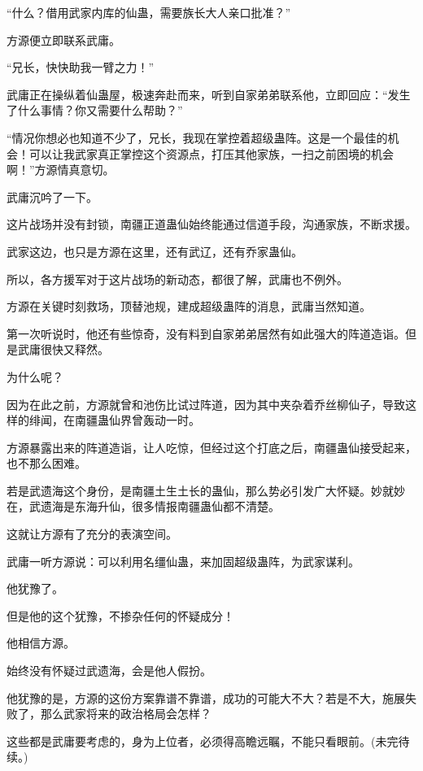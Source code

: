 \begin{this_body}
“什么？借用武家内库的仙蛊，需要族长大人亲口批准？”

方源便立即联系武庸。

“兄长，快快助我一臂之力！”

武庸正在操纵着仙蛊屋，极速奔赴而来，听到自家弟弟联系他，立即回应：“发生了什么事情？你又需要什么帮助？”

“情况你想必也知道不少了，兄长，我现在掌控着超级蛊阵。这是一个最佳的机会！可以让我武家真正掌控这个资源点，打压其他家族，一扫之前困境的机会啊！”方源情真意切。

武庸沉吟了一下。

这片战场并没有封锁，南疆正道蛊仙始终能通过信道手段，沟通家族，不断求援。

武家这边，也只是方源在这里，还有武辽，还有乔家蛊仙。

所以，各方援军对于这片战场的新动态，都很了解，武庸也不例外。

方源在关键时刻救场，顶替池规，建成超级蛊阵的消息，武庸当然知道。

第一次听说时，他还有些惊奇，没有料到自家弟弟居然有如此强大的阵道造诣。但是武庸很快又释然。

为什么呢？

因为在此之前，方源就曾和池伤比试过阵道，因为其中夹杂着乔丝柳仙子，导致这样的绯闻，在南疆蛊仙界曾轰动一时。

方源暴露出来的阵道造诣，让人吃惊，但经过这个打底之后，南疆蛊仙接受起来，也不那么困难。

若是武遗海这个身份，是南疆土生土长的蛊仙，那么势必引发广大怀疑。妙就妙在，武遗海是东海升仙，很多情报南疆蛊仙都不清楚。

这就让方源有了充分的表演空间。

武庸一听方源说：可以利用名缰仙蛊，来加固超级蛊阵，为武家谋利。

他犹豫了。

但是他的这个犹豫，不掺杂任何的怀疑成分！

他相信方源。

始终没有怀疑过武遗海，会是他人假扮。

他犹豫的是，方源的这份方案靠谱不靠谱，成功的可能大不大？若是不大，施展失败了，那么武家将来的政治格局会怎样？

这些都是武庸要考虑的，身为上位者，必须得高瞻远瞩，不能只看眼前。(未完待续。)

\end{this_body}

